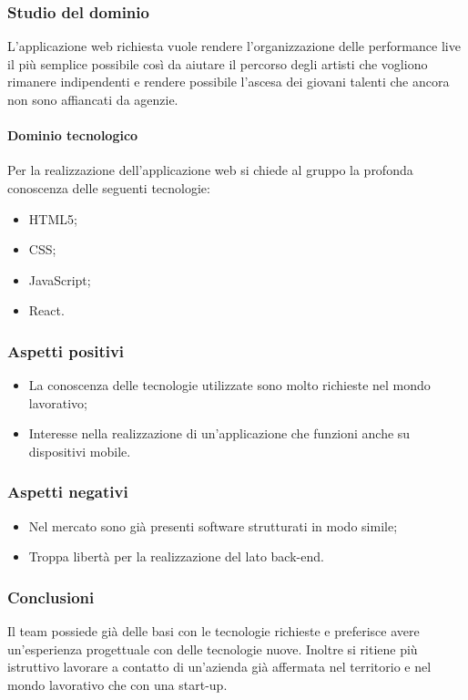 		\subsubsection{Studio del dominio} \Spazio
			L'applicazione web richiesta vuole rendere l’organizzazione delle performance live il più semplice possibile così da aiutare il percorso degli artisti che vogliono rimanere indipendenti e rendere possibile l'ascesa dei giovani talenti che ancora non sono affiancati da agenzie.
			\paragraph{Dominio tecnologico} \Spazio
			Per la realizzazione dell'applicazione web si chiede al gruppo la profonda conoscenza delle seguenti tecnologie:
			\begin{itemize}
				\item HTML5;
				\item CSS;
				\item JavaScript;
				\item React.
			\end{itemize}
		\subsubsection{Aspetti positivi}
		\begin{itemize}
			\item La conoscenza delle tecnologie utilizzate sono molto richieste nel mondo lavorativo;
			\item Interesse nella realizzazione di un'applicazione che funzioni anche su dispositivi mobile.
		\end{itemize}
		\subsubsection{Aspetti negativi}
		\begin{itemize}
			\item Nel mercato sono già presenti software strutturati in modo simile;
			\item Troppa libertà per la realizzazione del lato back-end.
		\end{itemize}
		\subsubsection{Conclusioni}
		Il team possiede già delle basi con le tecnologie richieste e preferisce avere un'esperienza progettuale con delle tecnologie nuove. Inoltre si ritiene più istruttivo lavorare a contatto di un'azienda già affermata nel territorio e nel mondo lavorativo che con una start-up.
	
	